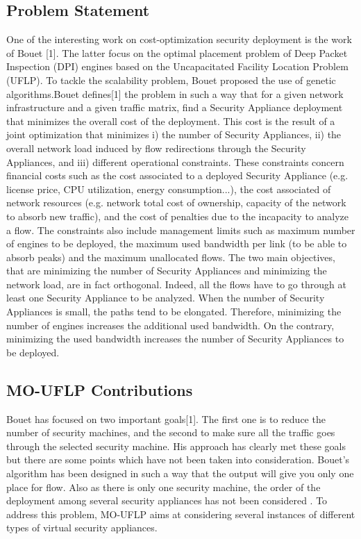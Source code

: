 \documentclass{article}
\begin{document}
\subsection{Problem Statement }
One of the interesting work on cost-optimization security deployment is the work of Bouet [1]. The latter focus on the optimal placement problem of Deep Packet Inspection (DPI) engines based on the Uncapacitated Facility Location Problem (UFLP). To tackle the scalability problem, Bouet proposed the use of genetic algorithms.Bouet defines[1] the problem in such a way that for a given network infrastructure and a given traffic matrix, find a Security Appliance deployment that minimizes the overall cost of the deployment. This cost is the result of a joint optimization that minimizes i) the number of Security Appliances, ii) the overall network load induced by flow redirections through the Security Appliances, and iii) different operational constraints. These constraints concern financial costs such as the cost associated to a deployed Security Appliance (e.g. license price, CPU utilization, energy consumption...), the cost associated of network resources (e.g. network total cost of ownership, capacity of the network to absorb new traffic), and the cost of penalties due to the incapacity to analyze a flow. The constraints also include management limits such as maximum number of engines to be deployed, the maximum used bandwidth per link (to be able to absorb peaks) and the maximum unallocated flows. The two main objectives, that are minimizing the number of Security Appliances and minimizing the network load, are in fact orthogonal. Indeed, all the flows have to go through at least one Security Appliance to be analyzed. When the number of Security Appliances is small, the paths tend to be elongated. Therefore, minimizing the number of engines increases the additional used bandwidth. On the contrary, minimizing the used bandwidth increases the number of Security Appliances to be deployed.
\subsection{MO-UFLP Contributions }
Bouet has focused on two important goals[1]. The first one is to reduce the number of security machines, and the second to make sure all the traffic goes through the selected security machine. His approach has clearly met these goals but there are some points which have not been taken into consideration.
Bouet's algorithm has been designed in such a way that the output will give you only one place for flow.
Also as there is only one security machine, the order of the deployment among several security appliances has not been considered .
To address this problem, MO-UFLP aims at considering several instances of different types of virtual security appliances.  
\end{document}
